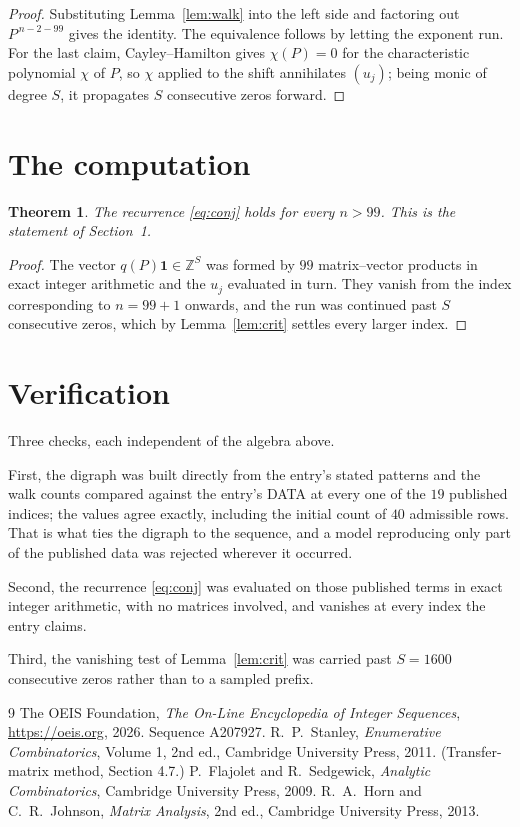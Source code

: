 \documentclass[11pt,a4paper]{article}
\theoremstyle{plain}
\newtheorem{theorem}{Theorem}
\theoremstyle{definition}
\begin{document}
\begin{proof}
Substituting Lemma~\ref{lem:walk} into the left side and factoring out
$P^{\,n-2-99}$ gives the identity. The equivalence follows by letting the exponent
run. For the last claim, Cayley--Hamilton gives $\chi(P)=0$ for the characteristic
polynomial $\chi$ of $P$, so $\chi$ applied to the shift annihilates $(u_j)$; being monic of
degree $S$, it propagates $S$ consecutive zeros forward.
\end{proof}

\section{The computation}

\begin{theorem}
The recurrence \eqref{eq:conj} holds for every $n>99$. This is the statement of
Section~1.
\end{theorem}

\begin{proof}
The vector $q(P)\mathbf{1}\in\mathbb{Z}^{S}$ was formed by $99$ matrix--vector
products in exact integer arithmetic and the $u_j$ evaluated in turn. They vanish from the
index corresponding to $n=99+1$ onwards, and the run was continued past $S$ consecutive
zeros, which by Lemma~\ref{lem:crit} settles every larger index.
\end{proof}

\section{Verification}

Three checks, each independent of the algebra above.

First, the digraph was built directly from the entry's stated patterns and the walk counts
compared against the entry's DATA at every one of the $19$ published indices; the
values agree exactly, including the initial count of $40$ admissible rows. That is
what ties the digraph to the sequence, and a model reproducing only part of the published
data was rejected wherever it occurred.

Second, the recurrence \eqref{eq:conj} was evaluated on those published terms in exact
integer arithmetic, with no matrices involved, and vanishes at every index the entry claims.

Third, the vanishing test of Lemma~\ref{lem:crit} was carried past $S=1600$ consecutive
zeros rather than to a sampled prefix.

\begin{thebibliography}{9}
 The OEIS Foundation, \emph{The On-Line Encyclopedia of Integer
Sequences}, \url{https://oeis.org}, 2026. Sequence A207927.
 R.~P.~Stanley, \emph{Enumerative Combinatorics}, Volume 1, 2nd ed.,
Cambridge University Press, 2011. (Transfer-matrix method, Section 4.7.)
 P.~Flajolet and R.~Sedgewick, \emph{Analytic Combinatorics}, Cambridge
University Press, 2009.
 R.~A.~Horn and C.~R.~Johnson, \emph{Matrix Analysis}, 2nd ed., Cambridge
University Press, 2013.
\end{thebibliography}
\end{document}
